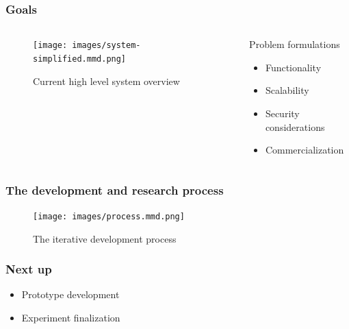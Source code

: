 \documentclass[10pt]{beamer}
\renewcommand{\section}[1]{\frametitle{#1}}
\begin{document}
    \begin{frame}
        \section{Goals}
		\pause

		\begin{columns}
			\begin{column}{0.5\textwidth}
				\begin{figure}
					\texttt{[image: images/system-simplified.mmd.png]}
					\caption{Current high level system overview}
				\end{figure}
			\end{column}
			\begin{column}{0.5\textwidth}
				\pause
				Problem formulations
				\begin{itemize}
					\pause
					\item Functionality
					\pause
					\item Scalability
					\pause
					\item Security considerations
					\pause
					\item Commercialization
				\end{itemize}
			\end{column}
		\end{columns}
    \end{frame}

    \begin{frame}
        \section{The development and research process}
		\begin{figure}
			\texttt{[image: images/process.mmd.png]}
			\caption{The iterative development process}
		\end{figure}
    \end{frame}

    \begin{frame}
        \section{Next up}
        \begin{itemize}
			\pause
            \item Prototype development
			\pause
            \item Experiment finalization
        \end{itemize}
    \end{frame}
\end{document}
